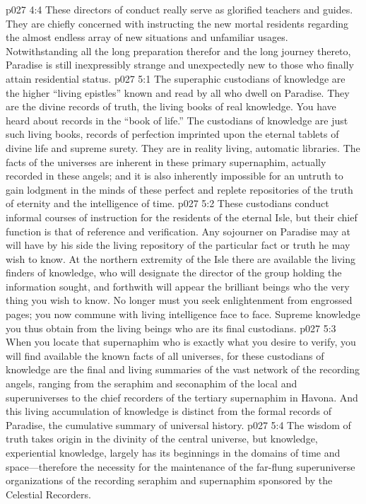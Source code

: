 \vs p027 4:4 These directors of conduct really serve as glorified teachers and guides. They are chiefly concerned with instructing the new mortal residents regarding the almost endless array of new situations and unfamiliar usages. Notwithstanding all the long preparation therefor and the long journey thereto, Paradise is still inexpressibly strange and unexpectedly new to those who finally attain residential status.\plusone
{}
\vs p027 5:1 The superaphic custodians of knowledge are the higher “living epistles” known and read by all who dwell on Paradise. They are the divine records of truth, the living books of real knowledge. You have heard about records in the “book of life.” The custodians of knowledge are just such living books, records of perfection imprinted upon the eternal tablets of divine life and supreme surety. They are in reality living, automatic libraries. The facts of the universes are inherent in these primary supernaphim, actually recorded in these angels; and it is also inherently impossible for an untruth to gain lodgment in the minds of these perfect and replete repositories of the truth of eternity and the intelligence of time.\plusone
\vs p027 5:2 These custodians conduct informal cours\-es of instruction for the residents of the eternal Isle, but their chief function is that of reference and verification. Any sojourner on Paradise may at will have by his side the living repository of the particular fact or truth he may wish to know. At the northern extremity of the Isle there are available the living finders of knowledge, who will designate the director of the group holding the information sought, and forthwith will appear the brilliant beings who  the very thing you wish to know. No longer must you seek enlightenment from engrossed pages; you now commune with living intelligence face to face. Supreme knowledge you thus obtain from the living beings who are its final custodians.\plusone
\vs p027 5:3 When you locate that supernaphim who is exactly what you desire to verify, you will find available  the known facts of all universes, for these custodians of knowledge are the final and living summaries of the vast network of the recording angels, ranging from the seraphim and seconaphim of the local and superuniverses to the chief recorders of the tertiary supernaphim in Havona. And this living accumulation of knowledge is distinct from the formal records of Paradise, the cumulative summary of universal history.
\vs p027 5:4 The wisdom of truth takes origin in the divinity of the central universe, but knowledge, experiential knowledge, largely has its beginnings in the domains of time and space---therefore the necessity for the maintenance of the far\hyp{}flung superuniverse organizations of the recording seraphim and supernaphim sponsored by the Celestial Recorders.
